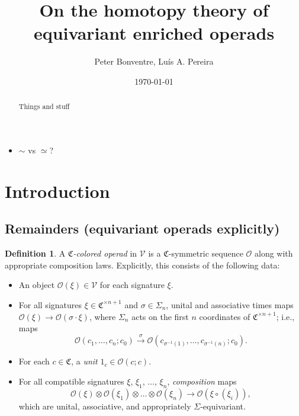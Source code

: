 \documentclass[a4paper,10pt
,draft
]{article}%
\title{On the homotopy theory of equivariant enriched operads}
\author{Peter Bonventre, Lu\'is A. Pereira}%
\date{\today}
\numberwithin{equation}{section}
\numberwithin{figure}{section}
\theoremstyle{definition} %
\newtheorem{definition}[equation]{Definition}%
\newcommand{\V}{\ensuremath{\mathcal V}}
\renewcommand{\O}{\ensuremath{\mathcal O}}
\newcommand{\ksi}{\xi}
\newcommand{\1}{\ensuremath{\mathbbm 1}}%
\begin{document}
\maketitle

\begin{abstract}
      Things and stuff
\end{abstract}

\begin{itemize}
\item $\sim$ vs $\simeq$?
\end{itemize}

\tableofcontents







\section{Introduction}


\subsection{Remainders (equivariant operads explicitly)}

\begin{definition}
      A \textit{$\mathfrak C$-colored operad} in $\V$ 
      is a $\mathfrak C$-symmetric sequence $\O$ along with appropriate composition laws.
      Explicitly, this consists of the following data:
      \begin{itemize} %
      \item An object $\O(\ksi) \in \V$ for each signature $\ksi$.
      \item For all signatures $\ksi \in \mathfrak C^{\times n+1}$ and $\sigma \in \Sigma_n$,
            unital and associative times maps $\O(\xi) \to \O(\sigma \cdot \xi)$,
            where $\Sigma_n$ acts on the first $n$ coordinates of $\mathfrak C^{\times n+1}$;
            i.e., maps
            \begin{equation}
                  \O(c_1, \ldots, c_n; c_0) \xrightarrow{\sigma} \O(c_{\sigma^{-1}(1)}, \ldots, c_{\sigma^{-1}(n)}; c_0).
            \end{equation}
      \item For each $c \in \mathfrak C$, a \textit{unit} $1_c \in \O(c;c)$.                        
      \item For all compatible signatures $\ksi$, $\ksi_1$, $\dots$, $\ksi_n$,
            \textit{composition} maps
            \begin{equation}
                  \O(\xi) \otimes \O(\xi_1) \otimes \ldots \otimes \O(\xi_n) \to \O(\xi \circ (\xi_i)),
            \end{equation}
            which are unital, associative, and appropriately $\Sigma$-equivariant.
      \end{itemize}
\end{definition}
\end{document}
